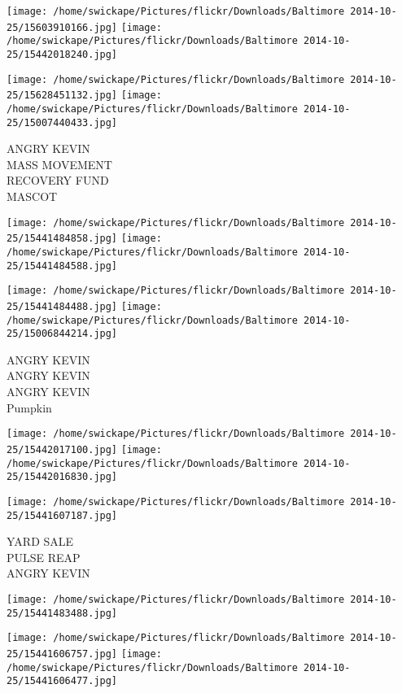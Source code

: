 \documentclass[10pt,letterpaper]{article}
\begin{document}
\texttt{[image: /home/swickape/Pictures/flickr/Downloads/Baltimore 2014-10-25/15603910166.jpg]}
\texttt{[image: /home/swickape/Pictures/flickr/Downloads/Baltimore 2014-10-25/15442018240.jpg]}

\texttt{[image: /home/swickape/Pictures/flickr/Downloads/Baltimore 2014-10-25/15628451132.jpg]}
\texttt{[image: /home/swickape/Pictures/flickr/Downloads/Baltimore 2014-10-25/15007440433.jpg]}

ANGRY KEVIN\\
MASS MOVEMENT\\
RECOVERY FUND\\
MASCOT\\
\pagebreak

\texttt{[image: /home/swickape/Pictures/flickr/Downloads/Baltimore 2014-10-25/15441484858.jpg]}
\texttt{[image: /home/swickape/Pictures/flickr/Downloads/Baltimore 2014-10-25/15441484588.jpg]}

\texttt{[image: /home/swickape/Pictures/flickr/Downloads/Baltimore 2014-10-25/15441484488.jpg]}
\texttt{[image: /home/swickape/Pictures/flickr/Downloads/Baltimore 2014-10-25/15006844214.jpg]}

ANGRY KEVIN\\
ANGRY KEVIN\\
ANGRY KEVIN\\
Pumpkin\\
\pagebreak

\texttt{[image: /home/swickape/Pictures/flickr/Downloads/Baltimore 2014-10-25/15442017100.jpg]}
\texttt{[image: /home/swickape/Pictures/flickr/Downloads/Baltimore 2014-10-25/15442016830.jpg]}

\vspace{0.25in}
\texttt{[image: /home/swickape/Pictures/flickr/Downloads/Baltimore 2014-10-25/15441607187.jpg]}

YARD SALE\\
PULSE REAP\\
ANGRY KEVIN\\
\pagebreak

\texttt{[image: /home/swickape/Pictures/flickr/Downloads/Baltimore 2014-10-25/15441483488.jpg]}

\vspace{0.25in}
\texttt{[image: /home/swickape/Pictures/flickr/Downloads/Baltimore 2014-10-25/15441606757.jpg]}
\texttt{[image: /home/swickape/Pictures/flickr/Downloads/Baltimore 2014-10-25/15441606477.jpg]}
\end{document}
